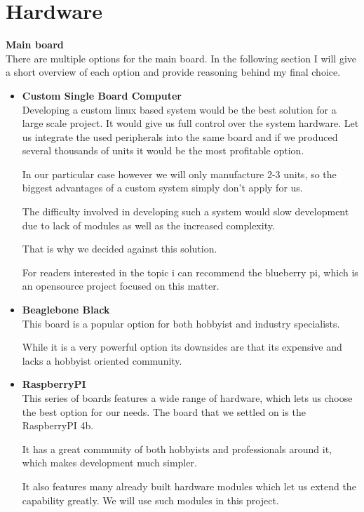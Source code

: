 \clearpage
\section{Hardware}

\large\textbf{Main board}\\
There are multiple options for the main board. In the following section I will give a short overview of each option and provide reasoning behind my final choice.
\begin{itemize}
    \item[]
          \large\textbf{Custom Single Board Computer}\\
          Developing a custom linux based system would be the best solution for a large scale project.
          It would give us full control over the system hardware. Let us integrate the used peripherals into the same board and if we
          produced several thousands of units it would be the most profitable option.

          In our particular case however we will only manufacture 2-3 units, so the
          biggest advantages of a custom system simply don't apply for us.

          The difficulty involved in developing such a system would slow development due
          to lack of modules as well as the increased complexity.

          That is why we decided against this solution.

          For readers interested in the topic i can recommend the blueberry pi, which is
          an opensource project focused on this matter.

    \item[]
          \large\textbf{Beaglebone Black}\\
          This board is a popular option for both hobbyist and industry specialists.

          While it is a very powerful option its downsides are that its expensive and
          lacks a hobbyist oriented community.

    \item[]
          \large\textbf{RaspberryPI}\\
          This series of boards features a wide range of hardware, which lets us choose the best option for our needs.
          The board that we settled on is the RaspberryPI 4b.

          It has a great community of both hobbyists and professionals around it, which
          makes development much simpler.

          It also features many already built hardware modules which let us extend the
          capability greatly. We will use such modules in this project.
\end{itemize}

